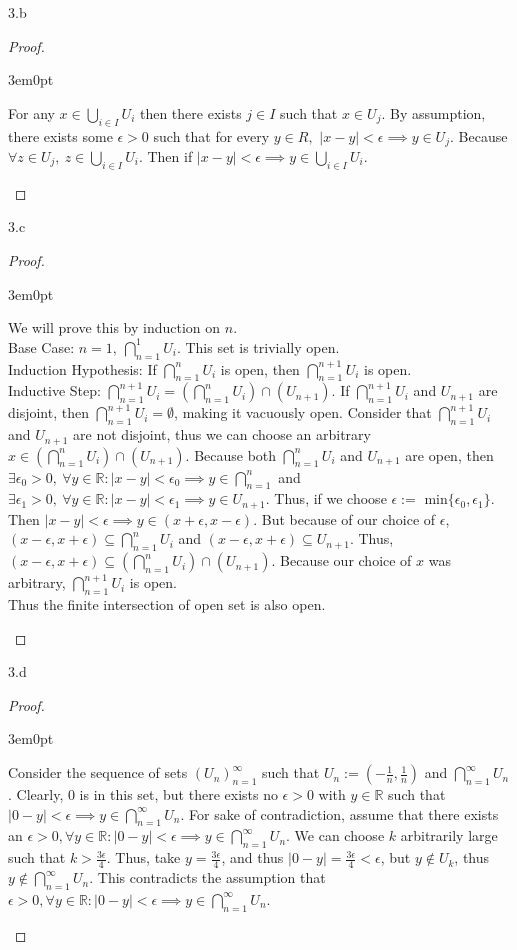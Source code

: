 \documentclass[11pt]{article}
\newcommand{\R}{\mathbb{R}}
\newenvironment{myproof}
{\begin{proof} \begin{adjustwidth}{3em}{0pt}$ $\par\nobreak\ignorespaces}
{\end{adjustwidth} \end{proof}}
\begin{document}
\begin{flushleft}
3.b

\begin{myproof}
For any $x \in \bigcup_{i \in I}U_i$ then there exists $j \in I$ such that $x \in U_j$. By assumption, there exists some $\epsilon > 0$ such that for every $y \in R,$ $|x-y| < \epsilon \implies y \in U_j$. Because $\forall z \in U_j, \ z \in \bigcup_{i \in I}U_i$. Then if $|x-y| < \epsilon \implies y \in \bigcup_{i \in I}U_i$.
\end{myproof}

3.c

\begin{myproof}
We will prove this by induction on $n$. \\
\bigskip
Base Case: $n = 1, \ \bigcap_{n = 1}^{1}U_i $. This set is trivially open. \\
Induction Hypothesis: If $\bigcap_{n = 1}^{n}U_i  $ is open, then $\bigcap_{n = 1}^{n+1}U_i$ is open. \\
Inductive Step: $\bigcap_{n = 1}^{n+1}U_i = (\bigcap_{n = 1}^{n}U_i) \cap (U_{n+1})$. If $\bigcap_{n = 1}^{n+1}U_i$ and $U_{n+1}$ are disjoint, then $\bigcap_{n = 1}^{n+1}U_i = \emptyset$, making it vacuously open. Consider that $\bigcap_{n = 1}^{n+1}U_i$ and $U_{n+1}$ are not disjoint, thus we can choose an arbitrary $x \in (\bigcap_{n = 1}^{n}U_i) \cap (U_{n+1})$. Because both $\bigcap_{n = 1}^{n}U_i$ and $U_{n+1}$ are open, then $\exists \epsilon_0 > 0, \ \forall y \in \R: |x-y| < \epsilon_0 \implies y \in \bigcap_{n = 1}^{n}$ and $\exists \epsilon_1 > 0, \ \forall y \in \R: |x-y| < \epsilon_1 \implies y \in U_{n+1}$. Thus, if we choose $\epsilon := \text{ min}\{ \epsilon_0, \epsilon_1 \}$. Then $|x-y| < \epsilon \implies y \in (x+ \epsilon, x -\epsilon)$. But because of our choice of $\epsilon$, $(x- \epsilon, x +\epsilon) \subseteq \bigcap_{n = 1}^{n}U_i$ and $(x- \epsilon, x +\epsilon) \subseteq U_{n+1}$. Thus, $(x-\epsilon, x+ \epsilon) \subseteq (\bigcap_{n = 1}^{n}U_i) \cap (U_{n+1})$. Because our choice of $x$ was arbitrary, $\bigcap_{n = 1}^{n+1}U_i$ is open. \\
\bigskip
Thus the finite intersection of open set is also open.
\end{myproof}

3.d

\begin{myproof}
Consider the sequence of sets $(U_n)_{n = 1}^{\infty}$ such that $U_n := (- \frac{1}{n}, \frac{1}{n})$ and $\bigcap_{n = 1}^{\infty} U_n$. Clearly, 0 is in this set, but there exists no $\epsilon > 0$ with $y \in \R$ such that $|0-y| < \epsilon \implies y \in \bigcap_{n = 1}^{\infty} U_n$. For sake of contradiction, assume that there exists an $\epsilon >0, \forall y \in \R: |0-y| < \epsilon \implies y \in \bigcap_{n = 1}^{\infty} U_n$. We can choose $k$ arbitrarily large such that $k > \frac{3 \epsilon}{4}$. Thus, take $y = \frac{3 \epsilon}{4}$, and thus $|0-y| = \frac{3 \epsilon}{4} < \epsilon$, but $y \notin U_k$, thus $y \notin \bigcap_{n = 1}^{\infty} U_n$. This contradicts the assumption that $\epsilon >0, \forall y \in \R: |0-y| < \epsilon \implies y \in \bigcap_{n = 1}^{\infty} U_n$.
\end{myproof}


\end{flushleft}
\end{document}
